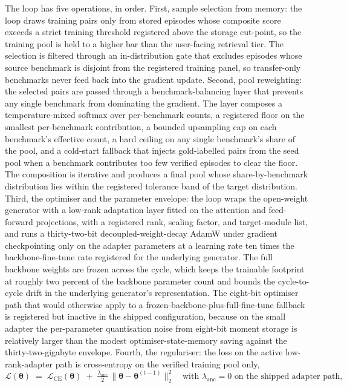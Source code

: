 The loop has five operations, in order. First, sample selection from memory: the loop draws training pairs only from stored episodes whose composite score exceeds a strict training threshold registered above the storage cut-point, so the training pool is held to a higher bar than the user-facing retrieval tier. The selection is filtered through an in-distribution gate that excludes episodes whose source benchmark is disjoint from the registered training panel, so transfer-only benchmarks never feed back into the gradient update. Second, pool reweighting: the selected pairs are passed through a benchmark-balancing layer that prevents any single benchmark from dominating the gradient. The layer composes a temperature-mixed softmax over per-benchmark counts, a registered floor on the smallest per-benchmark contribution, a bounded upsampling cap on each benchmark's effective count, a hard ceiling on any single benchmark's share of the pool, and a cold-start fallback that injects gold-labelled pairs from the seed pool when a benchmark contributes too few verified episodes to clear the floor. The composition is iterative and produces a final pool whose share-by-benchmark distribution lies within the registered tolerance band of the target distribution. Third, the optimiser and the parameter envelope: the loop wraps the open-weight generator with a low-rank adaptation layer fitted on the attention and feed-forward projections, with a registered rank, scaling factor, and target-module list, and runs a thirty-two-bit decoupled-weight-decay AdamW under gradient checkpointing only on the adapter parameters at a learning rate ten times the backbone-fine-tune rate registered for the underlying generator. The full backbone weights are frozen across the cycle, which keeps the trainable footprint at roughly two percent of the backbone parameter count and bounds the cycle-to-cycle drift in the underlying generator's representation. The eight-bit optimiser path that would otherwise apply to a frozen-backbone-plus-full-fine-tune fallback is registered but inactive in the shipped configuration, because on the small adapter the per-parameter quantisation noise from eight-bit moment storage is relatively larger than the modest optimiser-state-memory saving against the thirty-two-gigabyte envelope. Fourth, the regulariser: the loss on the active low-rank-adapter path is cross-entropy on the verified training pool only,
\begin{equation}
\mathcal{L}(\boldsymbol{\theta}) \;=\; \mathcal{L}_{\mathrm{CE}}(\boldsymbol{\theta}) \;+\; \tfrac{\lambda_{\text{anc}}}{2}\, \big\| \boldsymbol{\theta} - \boldsymbol{\theta}^{(t-1)} \big\|_{2}^{2}\quad\text{with $\lambda_{\text{anc}}=0$ on the shipped adapter path,}
\label{eq:sil-anchor}
\end{equation}
